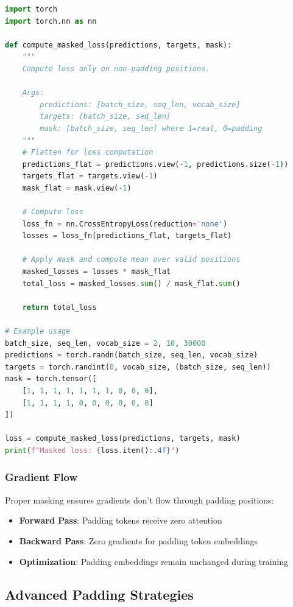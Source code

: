 \begin{lstlisting}[language=Python, caption=Masked Loss Computation]
import torch
import torch.nn as nn

def compute_masked_loss(predictions, targets, mask):
    """
    Compute loss only on non-padding positions.
    
    Args:
        predictions: [batch_size, seq_len, vocab_size]
        targets: [batch_size, seq_len]
        mask: [batch_size, seq_len] where 1=real, 0=padding
    """
    # Flatten for loss computation
    predictions_flat = predictions.view(-1, predictions.size(-1))
    targets_flat = targets.view(-1)
    mask_flat = mask.view(-1)
    
    # Compute loss
    loss_fn = nn.CrossEntropyLoss(reduction='none')
    losses = loss_fn(predictions_flat, targets_flat)
    
    # Apply mask and compute mean over valid positions
    masked_losses = losses * mask_flat
    total_loss = masked_losses.sum() / mask_flat.sum()
    
    return total_loss

# Example usage
batch_size, seq_len, vocab_size = 2, 10, 30000
predictions = torch.randn(batch_size, seq_len, vocab_size)
targets = torch.randint(0, vocab_size, (batch_size, seq_len))
mask = torch.tensor([
    [1, 1, 1, 1, 1, 1, 1, 0, 0, 0],
    [1, 1, 1, 1, 0, 0, 0, 0, 0, 0]
])

loss = compute_masked_loss(predictions, targets, mask)
print(f"Masked loss: {loss.item():.4f}")
\end{lstlisting}

\subsubsection{Gradient Flow}
Proper masking ensures gradients don't flow through padding positions:
\begin{itemize}
\item \textbf{Forward Pass}: Padding tokens receive zero attention
\item \textbf{Backward Pass}: Zero gradients for padding token embeddings
\item \textbf{Optimization}: Padding embeddings remain unchanged during training
\end{itemize}

\subsection{Advanced Padding Strategies}

